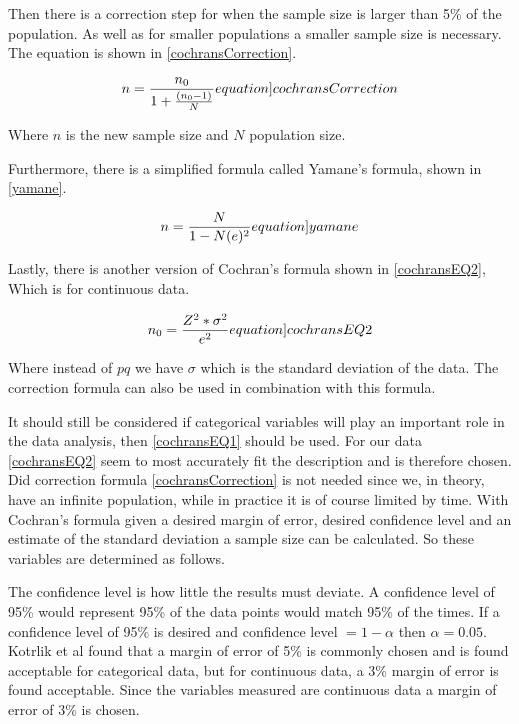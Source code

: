 Then there is a correction step for when the sample size is larger than 5\% of the population. As well as for smaller populations a smaller sample size is necessary.\cite{israel1992determining,kotrlik2001organizational} The equation is shown in \cref{cochransCorrection}.

\begin{equation}
    n = \frac{n_0}{1+\frac{(n_0-1)}{N}}
    \label[equation]{cochransCorrection}
\end{equation}

Where $n$ is the new sample size and $N$ population size.



Furthermore, there is a simplified formula called Yamane's formula, shown in \cref{yamane}\cite{israel1992determining}. 

\begin{equation}
    n = \frac{N}{1 - N(e)^2}
    \label[equation]{yamane}
\end{equation}


Lastly, there is another version of Cochran's formula shown in \cref{cochransEQ2}, Which is for continuous data. 

\begin{equation}
    n_0 = \frac{Z^2*\sigma^2}{e^2}
    \label[equation]{cochransEQ2}
\end{equation}

Where instead of $pq$ we have $\sigma$ which is the standard deviation of the data. The correction formula can also be used in combination with this formula.\nytafsnit



It should still be considered if categorical variables will play an important role in the data analysis, then \cref{cochransEQ1} should be used\cite{kotrlik2001organizational}. For our data \cref{cochransEQ2} seem to most accurately fit the description and is therefore chosen. Did correction formula \cref{cochransCorrection} is not needed since we, in theory, have an infinite population, while in practice it is of course limited by time. With Cochran's formula given a desired margin of error, desired confidence level and an estimate of the standard deviation a sample size can be calculated. So these variables are determined as follows. 

The confidence level is how little the results must deviate. A confidence level of 95\% would represent 95\% of the data points would match 95\% of the times. If a confidence level of 95\% is desired and confidence level $= 1 - \alpha$ then $\alpha = 0.05$. 
Kotrlik et al found that a margin of error of 5\% is commonly chosen and is found acceptable for categorical data, but for continuous data, a 3\% margin of error is found acceptable\cite{kotrlik2001organizational}. Since the variables measured are continuous data a margin of error of 3\% is chosen.

